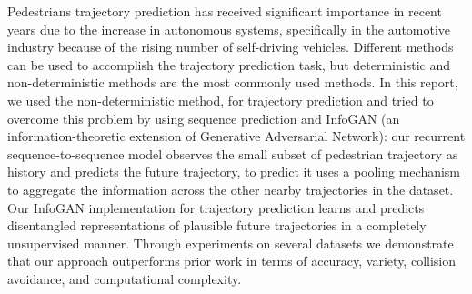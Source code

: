Pedestrians trajectory prediction has received significant importance in recent years due to the increase in autonomous systems, specifically in the automotive industry because of the rising number of self-driving vehicles. Different methods can be used to accomplish the trajectory prediction task, but deterministic and non-deterministic methods are the most commonly used methods. In this report, we used the non-deterministic method, for trajectory prediction and tried to overcome this problem by using sequence prediction and InfoGAN (an information-theoretic extension of Generative Adversarial Network): our recurrent sequence-to-sequence model observes the small subset of pedestrian trajectory as history and predicts the future trajectory, to predict it uses a pooling mechanism to aggregate the information across the other nearby trajectories in the dataset. Our InfoGAN implementation for trajectory prediction learns and predicts disentangled representations of plausible future trajectories in a completely unsupervised manner. Through experiments on several datasets we demonstrate that our approach outperforms prior work in terms of accuracy, variety, collision avoidance, and computational complexity.